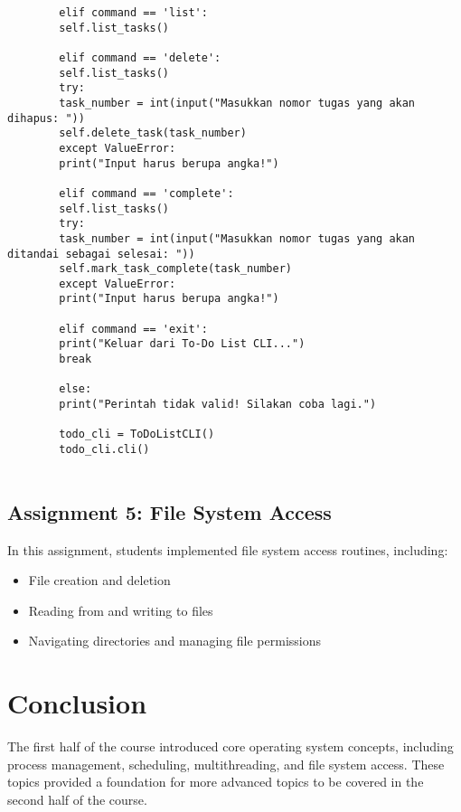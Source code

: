 \documentclass[12pt]{article}
\begin{document}
\begin{lstlisting}
		elif command == 'list':
		self.list_tasks()
		
		elif command == 'delete':
		self.list_tasks()
		try:
		task_number = int(input("Masukkan nomor tugas yang akan dihapus: "))
		self.delete_task(task_number)
		except ValueError:
		print("Input harus berupa angka!")
		
		elif command == 'complete':
		self.list_tasks()
		try:
		task_number = int(input("Masukkan nomor tugas yang akan ditandai sebagai selesai: "))
		self.mark_task_complete(task_number)
		except ValueError:
		print("Input harus berupa angka!")
		
		elif command == 'exit':
		print("Keluar dari To-Do List CLI...")
		break
		
		else:
		print("Perintah tidak valid! Silakan coba lagi.")
		
		todo_cli = ToDoListCLI()
		todo_cli.cli()
		
	\end{lstlisting}
	\subsection{Assignment 5: File System Access}
	In this assignment, students implemented file system access routines, including:
	\begin{itemize}
		\item File creation and deletion
		\item Reading from and writing to files
		\item Navigating directories and managing file permissions
	\end{itemize}
	
	\section{Conclusion}
	The first half of the course introduced core operating system concepts, including process management, scheduling, multithreading, and file system access. These topics provided a foundation for more advanced topics to be covered in the second half of the course.
	
\end{document}
